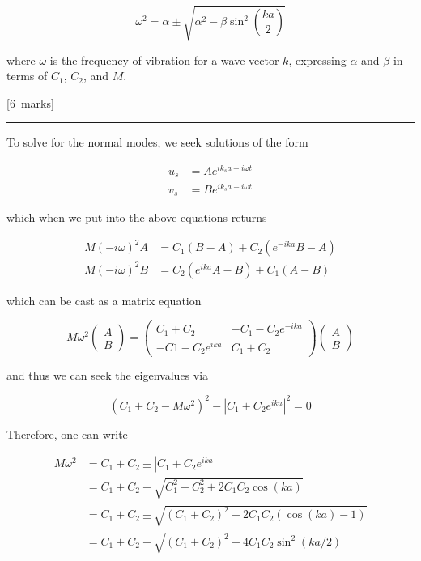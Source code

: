 \documentclass[12pt,a4paper]{article}
\newcommand{\sepline}[0]{\par \hfil\rule{10cm}{0.4pt} \vspace*{\parskip}\hfil}
\begin{document}
\begin{enumerate}
\begin{enumerate}
\begin{enumerate}
						$$ \omega^2 = \alpha \pm \sqrt{\alpha^2 - \beta \sin^2 \left(\frac{ka}{2}\right)} $$

						where $\omega$ is the frequency of vibration for a wave vector $k$, expressing $\alpha$ and $\beta$ in terms of $C_1$, $C_2$, and $M$.

						\hfill{[6~marks]}

						\begin{answer}

							\sepline

							To solve for the normal modes, we seek solutions of the form

							\begin{align*}
								u_s & = Ae^{i k_s a - i\omega t} \\
								v_s & = Be^{i k_s a - i\omega t}
							\end{align*}

							which when we put into the above equations returns

							$$
								\begin{aligned}
								M(-i \omega)^{2} A &=C_{1}(B-A)+C_{2}\left(e^{-i k a} B-A\right) \\
								M(-i \omega)^{2} B &=C_{2}\left(e^{i k a} A-B\right)+C_{1}(A-B)
								\end{aligned}
							$$

							which can be cast as a matrix equation

							$$
							M \omega^{2}\left(\begin{array}{c}
							A \\
							B
							\end{array}\right)=\left(\begin{array}{cc}
							C_{1}+C_{2} & -C_{1}-C_{2} e^{-i k a} \\
							-C 1-C_{2} e^{i k a} & C_{1}+C_{2}
							\end{array}\right)\left(\begin{array}{l}
							A \\
							B
							\end{array}\right)
							$$

							and thus we can seek the eigenvalues via

							$$
							(C_1 + C_2 - M\omega^2)^2 - \left|C_1 + C_2 e^{ika}\right|^2 = 0
							$$

							Therefore, one can write

							$$
								\begin{aligned}
									M \omega^{2} &=C_{1}+C_{2} \pm\left|C_{1}+C_{2} e^{i k a}\right| \\
									&=C_{1}+C_{2} \pm \sqrt{C_{1}^{2}+C_{2}^{2}+2 C_{1} C_{2} \cos (k a)} \\
									&=C_{1}+C_{2} \pm \sqrt{\left(C_{1}+C_{2}\right)^{2}+2 C_{1} C_{2}(\cos (k a)-1)} \\
									&=C_{1}+C_{2} \pm \sqrt{\left(C_{1}+C_{2}\right)^{2}-4 C_{1} C_{2} \sin ^{2}(k a / 2)}
								\end{aligned}
							$$


\end{answer}
\end{enumerate}
\end{enumerate}
\end{enumerate}
\end{document}
